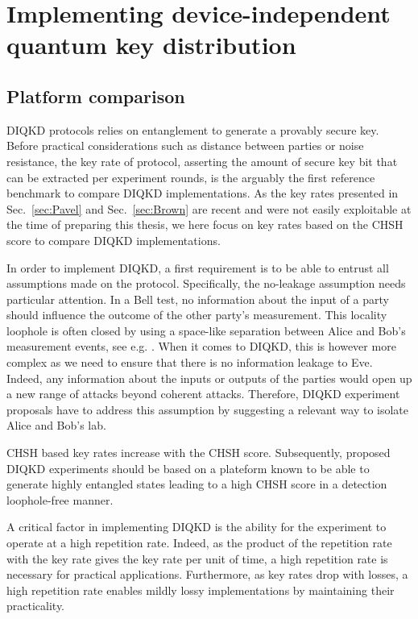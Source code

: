 \chapter{Implementing device-independent quantum key distribution}
\label{chap:implementing_diqkd}

\section{Platform comparison}

DIQKD protocols relies on entanglement to generate a provably secure key.
Before practical considerations such as distance between parties or noise resistance, the key rate of protocol, asserting the amount of secure key bit that can be extracted per experiment rounds, is the arguably the first reference benchmark to compare DIQKD implementations.
As the key rates presented in Sec.~\ref{sec:Pavel} and Sec.~\ref{sec:Brown} are recent and were not easily exploitable at the time of preparing this thesis, we here focus on key rates based on the CHSH score to compare DIQKD implementations.

\medbreak

In order to implement DIQKD, a first requirement is to be able to entrust all assumptions made on the protocol.
Specifically, the no-leakage assumption needs particular attention.
In a Bell test, no information about the input of a party should influence the outcome of the other party's measurement.
This locality loophole is often closed by using a space-like separation between Alice and Bob's measurement events, see e.g. \cite{Hensen2015,Giustina2015,Shalm2015}.
When it comes to DIQKD, this is however more complex as we need to ensure that there is no information leakage to Eve.
Indeed, any information about the inputs or outputs of the parties would open up a new range of attacks beyond coherent attacks.
Therefore, DIQKD experiment proposals have to address this assumption by suggesting a relevant way to isolate Alice and Bob's lab.

\medbreak

CHSH based key rates increase with the CHSH score.
Subsequently, proposed DIQKD experiments should be based on a plateform known to be able to generate highly entangled states leading to a high CHSH score in a detection loophole-free manner.

\medbreak

A critical factor in implementing DIQKD is the ability for the experiment to operate at a high repetition rate.
Indeed, as the product of the repetition rate with the key rate gives the key rate per unit of time, a high repetition rate is necessary for practical applications.
Furthermore, as key rates drop with losses, a high repetition rate enables mildly lossy implementations by maintaining their practicality.

